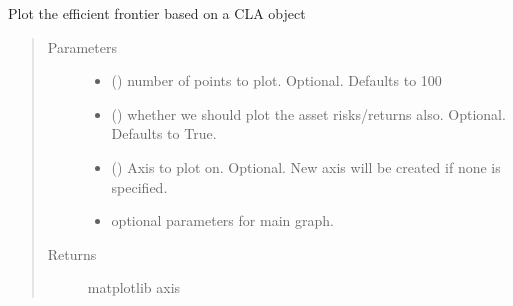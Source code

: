 \documentclass[letterpaper,10pt,english]{sphinxmanual}
\begin{document}
\begin{fulllineitems}
\label{\detokenize{dalio.util:dalio.util.plot_efficient_frontier}}
Plot the efficient frontier based on a CLA object
\begin{quote}\begin{description}
\item[{Parameters}] \leavevmode\begin{itemize}
\item {} 
 () \textendash{} number of points to plot. Optional. Defaults to 100

\item {} 
 () \textendash{} whether we should plot the asset risks/returns
also. Optional. Defaults to True.

\item {} 
 (\sphinxstyleliteralemphasis{\sphinxupquote{, }}) \textendash{} Axis to plot on. Optional. New axis will
be created if none is specified.

\item {} 
 \textendash{} optional parameters for main graph.

\end{itemize}

\item[{Returns}] \leavevmode
matplotlib axis

\end{description}\end{quote}

\end{fulllineitems}

\end{document}
